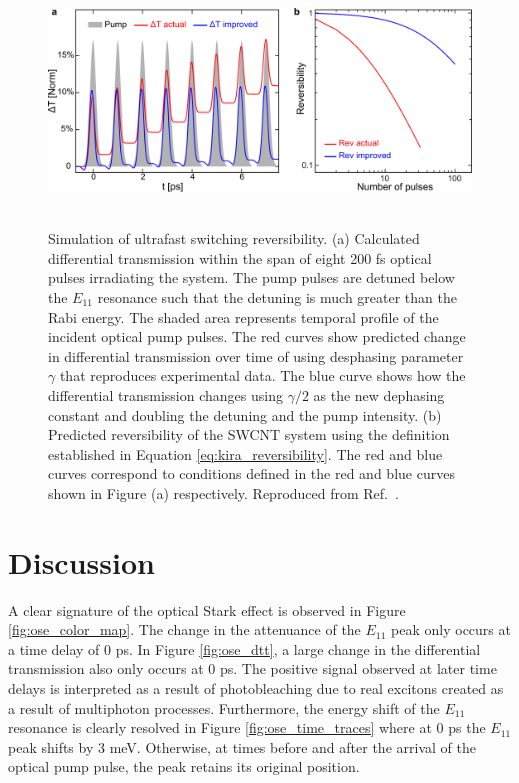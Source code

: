 \begin{figure}[ht]
	\centering
	\includegraphics[height=2.6in]{images/chapter_coherent/switching_reversibility}
	\caption{ Simulation of ultrafast switching reversibility. (a) Calculated differential transmission within the span of eight 200 fs optical pulses irradiating the system. The pump pulses are detuned below the $E_{11}$ resonance such that the detuning is much greater than the Rabi energy. The shaded area represents temporal profile of the incident optical pump pulses. The red curves show predicted change in differential transmission over time of using desphasing parameter $\gamma$ that reproduces experimental data. The blue curve shows how the differential transmission changes using $\gamma/2$ as the new dephasing constant and doubling the detuning and the pump intensity. (b) Predicted reversibility of the SWCNT system using the definition established in Equation \eqref{eq:kira_reversibility}. The red and blue curves correspond to conditions defined in the red and blue curves shown in Figure (a) respectively.  Reproduced from Ref.\ \cite{mack2019}.}
  \label{fig:ose_kira_simul}
\end{figure}



\clearpage

\section{Discussion}

A clear signature of the optical Stark effect is observed in Figure \ref{fig:ose_color_map}. The change in the attenuance of the $E_{11}$ peak only occurs at a time delay of 0 ps. In Figure \ref{fig:ose_dtt}, a large change in the differential transmission also only occurs at 0 ps. The positive signal observed at later time delays is interpreted as a result of photobleaching due to real excitons created as a result of multiphoton processes. Furthermore, the energy shift of the $E_{11}$ resonance is clearly resolved in Figure \ref{fig:ose_time_traces} where at 0 ps the $E_{11}$ peak shifts by 3 meV. Otherwise, at times before and after the arrival of the optical pump pulse, the peak retains its original position.

